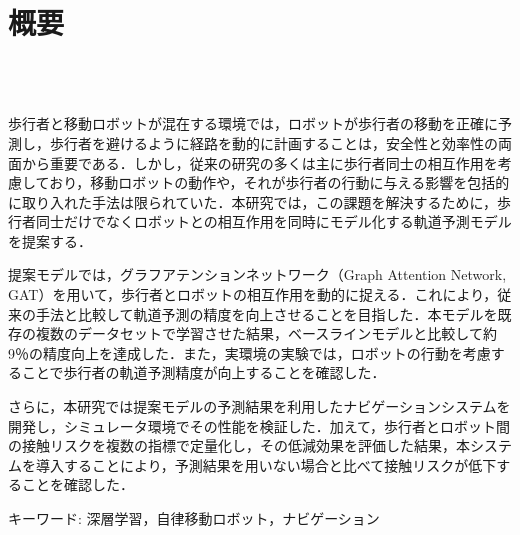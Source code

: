 \chapter*{概要}
\thispagestyle{empty}
%
\begin{center}
  \scalebox{1.5}{移動ロボットのための深層学習を用いた}\\
  \scalebox{1.5}{歩行者の位置予測とナビゲーションへの応用}\\
\end{center}
\vspace{1.0zh}
%

歩行者と移動ロボットが混在する環境では，ロボットが歩行者の移動を正確に予測し，歩行者を避けるように経路を動的に計画することは，安全性と効率性の両面から重要である．しかし，従来の研究の多くは主に歩行者同士の相互作用を考慮しており，移動ロボットの動作や，それが歩行者の行動に与える影響を包括的に取り入れた手法は限られていた．本研究では，この課題を解決するために，歩行者同士だけでなくロボットとの相互作用を同時にモデル化する軌道予測モデルを提案する．

提案モデルでは，グラフアテンションネットワーク（Graph Attention Network, GAT）を用いて，歩行者とロボットの相互作用を動的に捉える．これにより，従来の手法と比較して軌道予測の精度を向上させることを目指した．本モデルを既存の複数のデータセットで学習させた結果，ベースラインモデルと比較して約9％の精度向上を達成した．また，実環境の実験では，ロボットの行動を考慮することで歩行者の軌道予測精度が向上することを確認した．

さらに，本研究では提案モデルの予測結果を利用したナビゲーションシステムを開発し，シミュレータ環境でその性能を検証した．加えて，歩行者とロボット間の接触リスクを複数の指標で定量化し，その低減効果を評価した結果，本システムを導入することにより，予測結果を用いない場合と比べて接触リスクが低下することを確認した．

\begin{flushleft}
キーワード: 深層学習，自律移動ロボット，ナビゲーション
\end{flushleft}
%
\newpage

